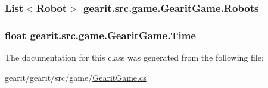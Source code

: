 \hypertarget{classgearit_1_1src_1_1game_1_1_gearit_game_ae1f52eb753ca8ce42306b0a2d2a99411}{
\subsubsection[{Robots}]{\setlength{\rightskip}{0pt plus 5cm}List$<${\bf Robot}$>$ gearit.\+src.\+game.\+Gearit\+Game.\+Robots\hspace{0.3cm}{\ttfamily [get]}}}\label{classgearit_1_1src_1_1game_1_1_gearit_game_ae1f52eb753ca8ce42306b0a2d2a99411}
\hypertarget{classgearit_1_1src_1_1game_1_1_gearit_game_a2af3127045fd9a572c6666356c34510a}{
\subsubsection[{Time}]{\setlength{\rightskip}{0pt plus 5cm}float gearit.\+src.\+game.\+Gearit\+Game.\+Time\hspace{0.3cm}{\ttfamily [get]}}}\label{classgearit_1_1src_1_1game_1_1_gearit_game_a2af3127045fd9a572c6666356c34510a}


The documentation for this class was generated from the following file\+:\begin{DoxyCompactItemize}
\item 
gearit/gearit/src/game/\hyperlink{_gearit_game_8cs}{Gearit\+Game.\+cs}\end{DoxyCompactItemize}
